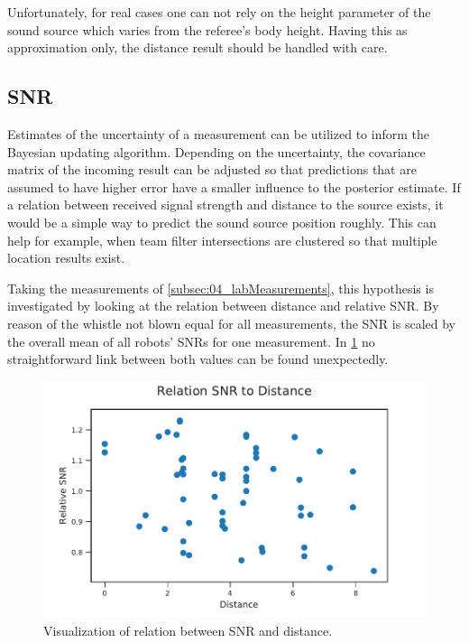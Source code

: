 Unfortunately, for real cases one can not rely on the height parameter of the sound
source which varies from the referee's body height.
Having this as approximation only, the distance result should be handled
with care.

\subsection{SNR}
\label{subsec:04_snr}

Estimates of the uncertainty of a measurement can be utilized to inform the
Bayesian updating algorithm.
Depending on the uncertainty, the covariance matrix of the incoming result can
be adjusted so that predictions that are assumed to have higher error have
a smaller influence to the posterior estimate.
If a relation between received signal strength and distance to the source exists,
it would be a simple way to predict the sound source position roughly.
This can help for example, when team filter intersections are clustered so that
multiple location results exist.

Taking the measurements of \cref{subsec:04_labMeasurements}, this hypothesis is
investigated by looking at the relation between distance and relative \ac{SNR}.
By reason of the whistle not blown equal for all measurements,
the \ac{SNR} is scaled by the overall mean of all robots' \acp{SNR} for one
measurement.
In \cref{fig:04_snrDistance} no straightforward
link between both values can be found unexpectedly.
\begin{figure}[ht]
	\centering
	\includegraphics[]{figures/evaluation/snr_scatter}
	\caption{Visualization of relation between SNR and distance.}
	\label{fig:04_snrDistance}
\end{figure}

